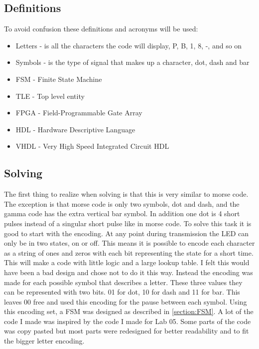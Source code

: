 \documentclass{article}
\begin{document}
\subsection{Definitions}
To avoid confusion these definitions and acronyms will be used:
\begin{itemize}
    \item Letters - is  all the characters the code will display, P, B, 1, 8, -, and so on
    \item Symbols - is the type of signal that makes up a character, dot, dash and bar
    \item FSM - Finite State Machine
    \item TLE - Top level entity
    \item FPGA - Field-Programmable Gate Array
    \item HDL - Hardware Descriptive Language
    \item VHDL - Very High Speed Integrated Circuit HDL
\end{itemize}
\clearpage
\subsection{Solving}\label{section:solving}
The first thing to realize when solving is that this is very similar to morse code. The exception is that morse code is only two symbols, dot and dash, and the gamma code has the extra vertical bar symbol. In addition one dot is 4 short pulses instead of a singular short pulse like in morse code. To solve this task it is good to start with the encoding. At any point during transmission the LED can only be in two states, on or off. This means it is possible to encode each character as a string of ones and zeros with each bit representing the state for a short time. This will make a code with little logic and a large lookup table. I felt this would have been a bad design and chose not to do it this way. Instead the encoding was made for each possible symbol that describes a letter. These three values they can be represented with two bits. 01 for dot, 10 for dash and 11 for bar. This leaves 00 free and used this encoding for the pause between each symbol. Using this encoding set, a FSM was designed as described in \ref{section:FSM}. A lot of the code I made was inspired by the code I made for Lab 05. Some parts of the code was copy pasted but most parts were redesigned for better readability and to fit the bigger letter encoding.
\end{document}
